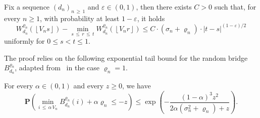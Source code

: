 \documentclass[AHL,Unicode,longabstracts,published]{cedram}
\newcommand{\ensembles}[1]{\mathbf{#1}}
\renewcommand{\P}{\ensembles{P}}
\renewcommand{\Pr}[1]{\P\left(#1\right)}
\newcommand{\1}{\ensembles{1}}
\renewcommand{\le}{\leqslant}
\renewcommand{\ge}{\geqslant}
\newcommand{\Wfn}{W_{d_n}^{\varrho_n}}
\newcommand{\Bfn}{B_{d_n}^{\varrho_n}}
\newcommand{\vertices}{V}
\begin{document}
\begin{prop}\label{prop:Holder_marche_Luka}
Fix a sequence $(d_n)_{n\,\ge\,1}$ and $\varepsilon \in (0,1)$, then there exists $C > 0$ such that, for every $n \ge 1$, with probability at least $1-\varepsilon$, it holds
\[
\Wfn\left(\left\lfloor\vertices_ns\right\rfloor\right) - \min_{s\,\le\,r\,\le\,t} \Wfn\left(\left\lfloor\vertices_nr\right\rfloor\right)
\le C \cdot \left(\sigma_n + \varrho_n\right) \cdot |t-s|^{(1-\varepsilon)/2}
\]
uniformly for $0 \le s < t \le 1$.
\end{prop}


The proof relies on the following exponential tail bound for the random bridge $\Bfn$, adapted from~\cite[Section~3]{AB12} in the case $\varrho_n=1$.

\begin{lemm}\label{lem:queue_exp_min_pont}
For every $\alpha \in (0,1)$ and every $z \ge 0$, we have
\[
\Pr{\min_{i\,\le\,\alpha\,\vertices_n} \Bfn(i) + \alpha \varrho_n \le - z}
\le \exp\left(- \frac{(1 - \alpha)^3 z^2}{2 \alpha \left(\sigma_n^2+\varrho_n\right) + z}\right).
\]
\end{lemm}
\end{document}
